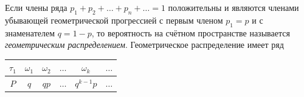 \begin{definition}
Если члены ряда $p_1 + p_2 + \ldots + p_n + \ldots = 1$ положительны и являются членами убывающей геометрической прогрессией с первым членом $p_1 = p$ и с знаменателем $q = 1 − p$, то вероятность на счётном пространстве называется \textit{геометрическим распределением}. Геометрическое распределение имеет ряд
\begin{center}
	\begin{tabular}{|c|c|c|c|c|c|}
		\hline
		$\tau_1$ & $\omega_1$ & $\omega_2$ & $\ldots$ & $\omega_k$ & $\ldots$ \\ \hline
		$P$  & $q$ & $qp$ & $\ldots$  & $q^{k-1}p$& $\ldots$ \\ \hline
	\end{tabular}
\end{center}
\end{definition}

